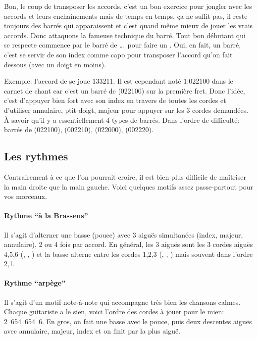 \documentclass[versionenligne]{patacrep}
\begin{document}
Bon, le coup de transposer les accords, c'est un bon exercice pour
jongler avec les accords et leurs enchaînements mais de temps en
temps, ça ne suffit pas, il reste toujours des barrés qui apparaissent
et c'est quand même mieux de jouer les vrais accords. Donc attaquons
la fameuse technique du barré. Tout bon débutant qui se respecte
commence par le barré de  \dots\, pour faire un
. Oui, en fait, un barré, c'est se servir de son index comme
capo pour transposer l'accord qu'on fait dessous (avec un doigt en
moins).

Exemple: l'accord de  se joue 133211. Il est cependant
noté 1:022100 dans le carnet de chant car c'est un barré de
 (022100) sur la première fret.  Donc l'idée, c'est
d'appuyer bien fort avec son index en travers de toutes les cordes et
d'utiliser annulaire, ptit doigt, majeur pour appuyer sur les 3 cordes
demandées. À savoir qu'il y a essentiellement 4 types de barrés.  Dans
l'ordre de difficulté: barrés de  (022100), 
(002210),  (022000),  (002220).

\subsection{Les rythmes}

Contrairement à ce que l'on pourrait croire, il est bien plus
difficile de maîtriser la main droite que la main gauche.
Voici quelques motifs assez passe-partout pour vos morceaux.

\paragraph{Rythme ``à la Brassens''} Il s'agit d'alterner une basse (pouce)
avec 3 aiguës simultanées (index, majeur, annulaire), 2 ou 4 fois par
accord. En général, les 3 aiguës sont les 3 cordes aiguës 4,5,6
(, , ) et la basse alterne entre
les cordes 1,2,3 (, , ) mais
souvent dans l'ordre 2,1.

\paragraph{Rythme ``arpège''} Il s'agit d'un motif note-à-note qui
accompagne très bien les chansons calmes. Chaque guitariste a le
sien, voici l'ordre des cordes à jouer pour le mien: 2~654~654~6. En
gros, on fait une basse avec le pouce, puis deux descentes aiguës avec
annulaire, majeur, index et on finit par la plus aiguë.
\end{document}
